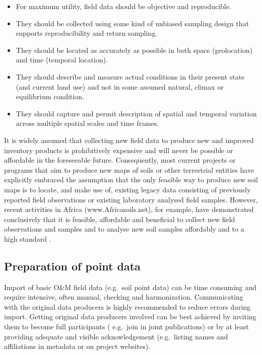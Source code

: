 \documentclass[graybox,natbib,nospthms,UStrade]{svmono}
\begin{document}
\begin{itemize}
\item
  For maximum utility, field data should be objective
  and reproducible.
\item
  They should be collected using some kind of unbiased sampling design
  that supports reproducibility and return sampling.
\item
  They should be located as accurately as possible in both
  space (geolocation) and time (temporal location).
\item
  They should describe and measure actual conditions in their present
  state (and current land use) and not in some assumed natural,
  climax or equilibrium condition.
\item
  They should capture and permit description of spatial and temporal
  variation across multiple spatial scales and time frames.
\end{itemize}

It is widely assumed that collecting new field data to produce new and
improved inventory products is prohibitively expensive and will never be
possible or affordable in the foreseeable future. Consequently, most
current projects or programs that aim to produce new maps of soils or
other terrestrial entities have explicitly embraced the assumption that
the only feasible way to produce new soil maps is to locate, and make
use of, existing legacy data consisting of previously reported field
observations or existing laboratory analysed field samples. However,
recent activities in Africa (www.Africasoils.net), for example, have
demonstrated conclusively that it is feasible, affordable and beneficial
to collect new field observations and samples and to analyse new soil
samples affordably and to a high standard \citep{ShepherdWalsh2007JNIS}.

\hypertarget{preparation-of-point-data}{%
\subsection{Preparation of point data}\label{preparation-of-point-data}}

Import of basic O\&M field data (e.g.~soil point data) can be time
consuming and require intensive, often manual, checking and harmonization.
Communicating with the original data producers is highly recommended to
reduce errors during import. Getting original data producers involved
can be best achieved by inviting them to become full participants (
e.g.~join in joint publications) or by at least providing adequate and
visible acknowledgement (e.g.~listing names and affiliations in metadata
or on project websites).
\end{document}
